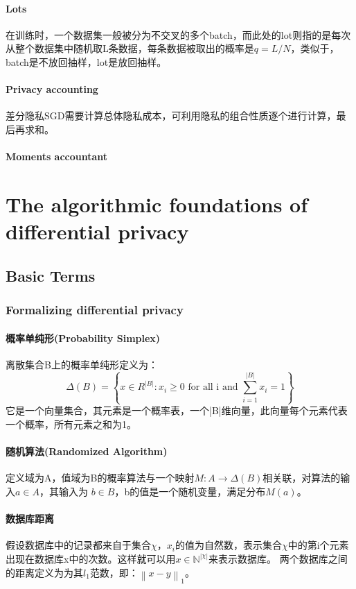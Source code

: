 \documentclass[12pt,a4paper]{article}
\begin{document}
\paragraph{Lots} 在训练时，一个数据集一般被分为不交叉的多个batch，而此处的lot则指的是每次从整个数据集中随机取L条数据，每条数据被取出的概率是$q=L/N$，类似于，batch是不放回抽样，lot是放回抽样。
\paragraph{Privacy accounting} 差分隐私SGD需要计算总体隐私成本，可利用隐私的组合性质逐个进行计算，最后再求和。
\paragraph{Moments accountant} 


\section{The algorithmic foundations of differential privacy\cite{dwork2014algorithmic}}
\subsection{Basic Terms}
\subsubsection{Formalizing differential privacy}

\paragraph{概率单纯形(Probability Simplex)} 离散集合B上的概率单纯形定义为：
\begin{equation}
	\Delta (B) = \left \{ x \in R^{|B|}: x_i \geq \mbox{0 for all i and } \sum_{i=1}^{|B|} x_i=1 \right \}
\end{equation}
它是一个向量集合，其元素是一个概率表，一个|B|维向量，此向量每个元素代表一个概率，所有元素之和为1。
\paragraph{随机算法(Randomized Algorithm)} 定义域为A，值域为B的概率算法与一个映射$M:A \rightarrow \Delta (B)$相关联，对算法的输入$a \in A $，其输入为 $b \in B$，b的值是一个随机变量，满足分布$M(a)$。
\paragraph{数据库距离} 假设数据库中的记录都来自于集合$\chi$，$x_i$的值为自然数，表示集合$\chi$中的第i个元素出现在数据库x中的次数。这样就可以用$x\in \mathbb{N}^{|\chi |}$来表示数据库。 两个数据库之间的距离定义为为其$l_1$范数，即：$\left \| x-y \right \|_1$。
\end{document}
